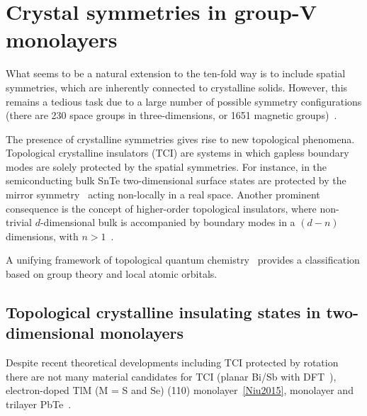 \chapter{Crystal symmetries in group-V monolayers}
\label{ch:oals}
 
What seems to be a natural extension to the ten-fold way is to include spatial symmetries, which are inherently connected to crystalline solids. However, this remains a tedious task due to a large number of possible symmetry configurations (there are 230 space groups in three-dimensions, or 1651 magnetic groups)~\cite{Slager2013, PhysRevB.90.165114, PhysRevB.93.195413, PhysRevB.95.235425, PhysRevB.93.045429}.

The presence of crystalline symmetries gives rise to new topological phenomena. Topological crystalline insulators (TCI) are systems in which gapless boundary modes are solely protected by the spatial symmetries. For instance, in the semiconducting bulk SnTe two-dimensional surface states are protected by the mirror symmetry~\cite{FuTCI2011, HsiehTCI2012} acting non-locally in a real space. Another prominent consequence is the concept of higher-order topological insulators, where non-trivial $d$-dimensional bulk is accompanied by boundary modes in a $(d-n)$ dimensions, with $n > 1$~\cite{Benalcazar61, PhysRevLett.119.246401, HOTI12018}. 

A unifying framework of topological quantum chemistry~\cite{TQC2017} provides a classification based on group theory and local atomic orbitals.






\section{Topological crystalline insulating states in two-dimensional monolayers}

Despite recent theoretical developments including TCI protected by rotation~\cite{PhysRevX.9.031003, Fangeaat2374}
there are not many material candidates for TCI  (planar Bi/Sb with DFT~\cite{Hsu2016}),  electron-doped TlM (M = S and Se) (110) monolayer~\ref{Niu2015}, monolayer and trilayer PbTe~\cite{C7CP04679K}.


